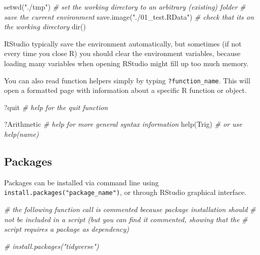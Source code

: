\documentclass[
  oneside]{book}
\newenvironment{Shaded}{\begin{snugshade}}{\end{snugshade}}
\newcommand{\CommentTok}[1]{\textcolor[rgb]{0.56,0.35,0.01}{\textit{#1}}}
\newcommand{\FunctionTok}[1]{\textcolor[rgb]{0.00,0.00,0.00}{#1}}
\newcommand{\NormalTok}[1]{#1}
\newcommand{\StringTok}[1]{\textcolor[rgb]{0.31,0.60,0.02}{#1}}
\begin{document}
\begin{Shaded}
\begin{Highlighting}[]
\FunctionTok{setwd}\NormalTok{(}\StringTok{"./tmp"}\NormalTok{) }\CommentTok{\# set the working directory to an arbitrary (existing) folder}
\CommentTok{\# save the current environment}
\FunctionTok{save.image}\NormalTok{(}\StringTok{"./01\_test.RData"}\NormalTok{)}
\CommentTok{\# check that it\textquotesingle{}s on the working directory}
\FunctionTok{dir}\NormalTok{()}
\end{Highlighting}
\end{Shaded}

RStudio typically save the environment automatically,
but sometimes (if not every time you close R) you should
clear the environment variables, because loading many variables
when opening RStudio might fill up too much memory.

You can also read function helpers simply by typing \texttt{?function\_name}. This
will open a formatted page with information about a specific R function or object.

\begin{Shaded}
\begin{Highlighting}[]
\NormalTok{?quit }\CommentTok{\# help for the quit function}

\NormalTok{?Arithmetic }\CommentTok{\# help for more general syntax information}
\FunctionTok{help}\NormalTok{(Trig) }\CommentTok{\# or use help(name)}
\end{Highlighting}
\end{Shaded}

\hypertarget{packages}{%
\subsection{Packages}\label{packages}}

Packages can be installed via command line using
\texttt{install.packages("package\_name")}, or through RStudio graphical interface.

\begin{Shaded}
\begin{Highlighting}[]
\CommentTok{\# the following function call is commented because package installation should}
\CommentTok{\# not be included in a script (but you can find it commented, showing that the}
\CommentTok{\# script requires a package as dependency)}

\CommentTok{\# install.packages("tidyverse")}
\end{Highlighting}
\end{Shaded}
\end{document}
